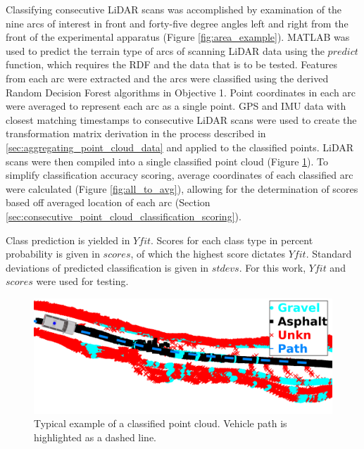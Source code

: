 \documentclass[numbered,pdftex]{ohio-etd}
\begin{document}
{{		{Classifying consecutive LiDAR scans was accomplished by examination of the nine arcs of interest in front and forty-five degree angles left and right from the front of the experimental apparatus (Figure \ref{fig:area_example}). MATLAB was used to predict the terrain type of arcs of scanning LiDAR data using the $predict$ function, which requires the RDF and the data that is to be tested. Features from each arc were extracted and the arcs were classified using the derived Random Decision Forest algorithms in Objective 1. Point coordinates in each arc were averaged to represent each arc as a single point. GPS and IMU data with closest matching timestamps to consecutive LiDAR scans were used to create the transformation matrix derivation in the process described in \ref{sec:aggregating_point_cloud_data} and applied to the classified points. LiDAR scans were then compiled into a single classified point cloud (Figure \ref{fig:db_1_all_points_example_withvan}). To simplify classification accuracy scoring, average coordinates of each classified arc were calculated (Figure \ref{fig:all_to_avg}), allowing for the determination of scores based off averaged location of each arc (Section \ref{sec:consecutive_point_cloud_classification_scoring}).}
		
		
		
		{Class prediction is yielded in $Yfit$. Scores for each class type in percent probability is given in $scores$, of which the highest score dictates $Yfit$. Standard deviations of predicted classification is given in $stdevs$. For this work, $Yfit$  and $scores$ were used for testing.}
		
		\begin{figure}[H]
			\centering
			\includegraphics[width=0.9\linewidth]{Defense_Images/db_1_all_points_example_withvan}
			\caption[Classified Point Cloud]{Typical example of a classified point cloud. Vehicle path is highlighted as a dashed line.}
			\label{fig:db_1_all_points_example_withvan}
		\end{figure}
		
}}
\end{document}
